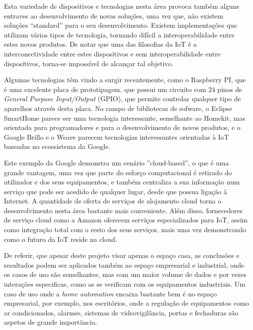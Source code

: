 Esta variedade de dispositivos e tecnologias nesta área provoca também alguns entraves ao desenvolvimento de novas soluções, uma vez que, não existem soluções “standard” para o seu desenvolvimento. Existem implementações que utilizam vários tipos de tecnologia, tornando difícil a interoperabilidade entre estes novos produtos. De notar que uma das filosofias da IoT é a interconectividade entre estes dispositivos e sem interoperabilidade entre dispositivos, torna-se impossível de alcançar tal objetivo.

Algumas tecnologias têm vindo a surgir recentemente, como o Raspberry PI, que é uma excelente placa de prototipagem, que possui um circuito com 24 pinos de \textit{General Purpose Input/Output} (GPIO), que permite controlar qualquer tipo de aparelhos através desta placa. No campo de bibliotecas de sofware, o Eclipse SmartHome parece ser uma tecnologia interessante, semelhante ao Homekit, mas orientada para programadores e para o desenvolvimento de novos produtos, e o Google Brillo e o Weave parecem tecnologias interessantes orientadas à IoT baseadas no ecossistema da Google.

Este exemplo da Google demonstra um cenário ''cloud-based'', o que é uma grande vantagem, uma vez que parte do esforço computacional é retirado do utilizador e dos seus equipamentos, e também centraliza a sua informação num serviço que pode ser acedido de qualquer lugar, desde que possua ligação à Internet. A quantidade de oferta de serviços de alojamento cloud torna o desenvolvimento nesta área bastante mais conveniente. Além disso, fornecedores de serviço cloud como a Amazon oferecem serviços especializados para IoT, assim como integração total com o resto dos seus serviços, mais uma vez demonstrando como o futuro da IoT reside na cloud.

De referir, que apesar deste projeto visar apenas o espaço casa, as conclusões e resultados podem ser aplicados também ao espaço empresarial e industrial, onde os casos de uso são semelhantes, mas com um maior volume de dados e por vezes interações especificas, como as se verificam com os equipamentos industriais. Um caso de uso onde a \textit{home automation} encaixa bastante bem é no espaço empresarial, por exemplo, nos escritórios, onde a regulação de equipamentos como ar condicionados, alarmes, sistemas de videovigilância, portas e fechaduras são aspetos de grande importância.